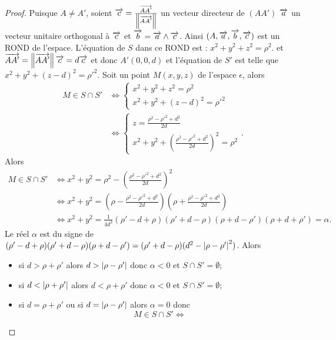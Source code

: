 \begin{proof}
  Puisque \(A \neq A'\), soient \(\overrightarrow{c} = 
  \frac{\overrightarrow{AA'}}{\left\lVert\overrightarrow{AA'}\right\rVert}\) un vecteur directeur de \((AA')\) 
  \(\overrightarrow{a}\) un vecteur unitaire orthogonal à \(\overrightarrow{c}\) et \(\overrightarrow{b} = \overrightarrow{a}\wedge\overrightarrow{c}\). 
  Ainsi \((A, \overrightarrow{a}, \overrightarrow{b}, \overrightarrow{c})\) est un ROND de l'espace.  L'équation de \(S\) 
  dans ce ROND est : \(x^2 + y^2 + z^2 = \rho^2\). et \(\overrightarrow{AA'} = 
  \left\lVert\overrightarrow{AA'}\right\rVert\overrightarrow{c} = d\overrightarrow{c}\) et donc \(A'(0, 0, d)\) et l'équation de 
  \(S'\) est telle que \(x^2 + y^2 + (z - d)^2 = \rho'^2\).  Soit un point 
  \(M(x, y, z)\) de l'espace \(\epsilon\), alors
  \begin{align}
    M \in S\cap S'
    & \iff
    \begin{cases}
      x^2 + y^2 + z^2 = \rho^2 \\
      x^2 + y^2 + (z - d)^2 = \rho'^2
    \end{cases} \\
    & \iff
    \begin{cases}
      z = \frac{\rho^2 - \rho'^2 + d^2}{2d}\\
      x^2 + y^2 + \left(\frac{\rho^2 - \rho'^2 + d^2}{2d}\right)^2 = \rho^2
    \end{cases}.
  \end{align}
  Alors
  \begin{align}
    M \in S\cap S'
    &\iff x^2 + y^2 = \rho^2 - \left(\frac{\rho^2 - \rho'^2 + 
    d^2}{2d}\right)^2\\
    &\iff x^2 + y^2 = \left(\rho - \frac{\rho^2 - \rho'^2 + 
    d^2}{2d}\right)\left(\rho + \frac{\rho^2 - \rho'^2 + d^2}{2d}\right)\\
    &\iff x^2 + y^2 = \frac{1}{4d^2}(\rho'-d + \rho)(\rho'+d - \rho)(\rho + d - 
    \rho')(\rho + d+\rho')=\alpha.
  \end{align}
  Le réel \(\alpha\) est du signe de \((\rho'-d + \rho)(\rho'+d - 
  \rho)(\rho + d - \rho')=(\rho'+d - \rho)(d^2 - \left\lvert\rho - \rho'\right\rvert^2)\).  
  Alors
  \begin{itemize}
    \item si \(d>\rho + \rho'\) alors \(d>\left\lvert\rho - \rho'\right\rvert\) donc 
      \(\alpha<0\) et \(S\cap S'=\emptyset\);
    \item si \(d<\left\lvert\rho + \rho'\right\rvert\) alors \(d<\rho + \rho'\) donc 
      \(\alpha<0\) et \(S\cap S'=\emptyset\);
    \item si \(d = \rho + \rho'\) ou si \(d = \left\lvert\rho - \rho'\right\rvert\) alors 
      \(\alpha = 0\) donc
      \begin{equation}
        M\in S\cap S' 
        \iff 

\end{equation}
\end{itemize}
\end{proof}
